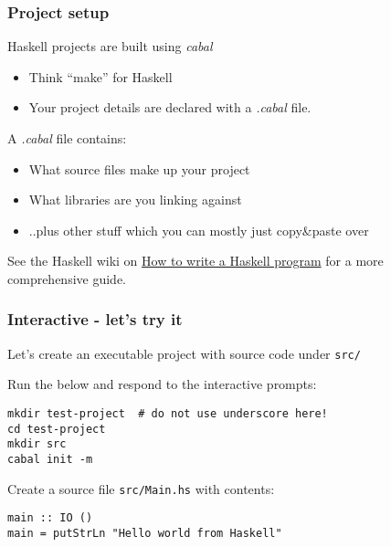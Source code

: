 \documentclass{beamer}
\begin{document}
\begin{frame}[fragile]

\frametitle{Project setup}

Haskell projects are built using {\em cabal}

\begin{itemize}
  \item Think ``make'' for Haskell
  \item Your project details are declared with a {\em .cabal} file.
\end{itemize}

A {\em .cabal} file contains:
\begin{itemize}
  \item What source files make up your project
  \item What libraries are you linking against
  \item ..plus other stuff which you can mostly just copy\&paste over
\end{itemize}

\medskip
See the Haskell wiki on \href{http://www.haskell.org/haskellwiki/How_to_write_a_Haskell_program}{How
  to write a Haskell program} for a more comprehensive guide.

\end{frame}


\begin{frame}[fragile]
\frametitle{Interactive - let's try it}

Let's create an executable project with source code under \verb|src/|
\medskip

Run the below and respond to the interactive prompts:

\begin{verbatim}
mkdir test-project  # do not use underscore here!
cd test-project
mkdir src
cabal init -m
\end{verbatim}

Create a source file \verb|src/Main.hs| with contents:

\begin{verbatim}
main :: IO ()
main = putStrLn "Hello world from Haskell"
\end{verbatim}

\end{frame}
\end{document}
